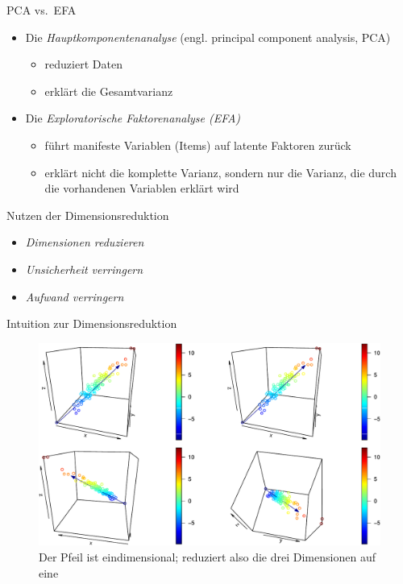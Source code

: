 \begin{frame}{PCA vs.~EFA}

\begin{itemize}
\tightlist
\item
  Die \emph{Hauptkomponentenanalyse} (engl. principal component
  analysis, PCA)

  \begin{itemize}
  \tightlist
  \item
    reduziert Daten
  \item
    erklärt die Gesamtvarianz
  \end{itemize}
\item
  Die \emph{Exploratorische Faktorenanalyse (EFA)}

  \begin{itemize}
  \tightlist
  \item
    führt manifeste Variablen (Items) auf latente Faktoren zurück
  \item
    erklärt nicht die komplette Varianz, sondern nur die Varianz, die
    durch die vorhandenen Variablen erklärt wird
  \end{itemize}
\end{itemize}

\end{frame}

\begin{frame}{Nutzen der Dimensionsreduktion}

\begin{itemize}
\item
  \emph{Dimensionen reduzieren}
\item
  \emph{Unsicherheit verringern}
\item
  \emph{Aufwand verringern}
\end{itemize}

\end{frame}

\begin{frame}{Intuition zur Dimensionsreduktion}

\begin{figure}

{\centering \includegraphics[width=0.8\linewidth]{PraDa_Folien_nm_2_files/figure-beamer/fig-scatter3d-1} 

}

\caption{Der Pfeil ist eindimensional; reduziert also die drei Dimensionen auf eine}\label{fig:fig-scatter3d}
\end{figure}

\end{frame}

